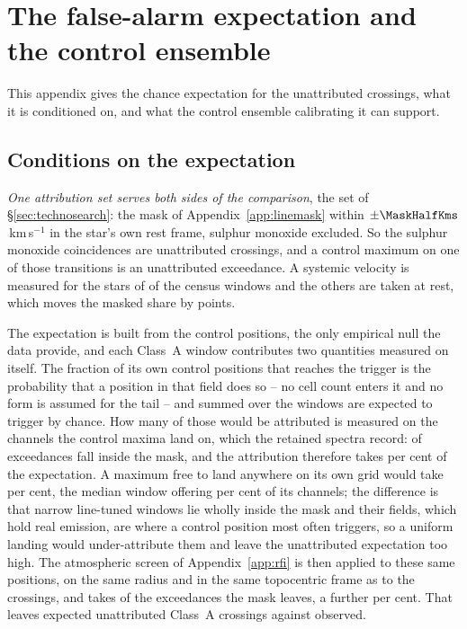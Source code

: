 \section{The false-alarm expectation and the control ensemble}
\label{app:falsealarm}

This appendix gives the chance expectation for the unattributed crossings,
what it is conditioned on, and what the control ensemble calibrating it can
support.

\subsection{Conditions on the expectation}

\emph{One attribution set serves both sides of the comparison}, the set of
\S\ref{sec:technosearch}: the mask of Appendix~\ref{app:linemask} within
$\pm\MaskHalfKms$\,km\,s$^{-1}$ in the star's own rest frame, sulphur monoxide
excluded. So the \MkNSODecide{} sulphur monoxide coincidences are unattributed
crossings, and a control maximum on one of those transitions is an
unattributed exceedance. A systemic velocity is measured for the stars of
\CeNVsys{} of the census windows and the others are taken at rest, which moves
the masked share by \CeVsysSensPct{} points.

The expectation is built from the control positions, the only empirical null
the data provide, and each Class~A window contributes two quantities
measured on itself. The fraction of its own \NCtrl{} control positions that
reaches the trigger is the probability that a position in that field does so
-- no cell count enters it and no form is assumed for the tail -- and
summed over the windows \CeExpTrig{} are expected to trigger by chance. How
many of those would be attributed is measured on the channels the control
maxima land on, which the retained spectra record: \CeNExcAttr{} of
\CeNExc{} exceedances fall inside the mask, and the attribution therefore
takes \CeMaskPct{} per cent of the expectation. A maximum free to land
anywhere on its own grid would take \CeUnifPct{} per cent, the median window
offering \CeMaskPctMed{} per cent of its channels; the difference is that
\CeNFullMask{} narrow line-tuned windows lie wholly inside the mask and
their fields, which hold real emission, are where a control position most
often triggers, so a uniform landing would under-attribute them and leave
the unattributed expectation too high. The atmospheric screen of
Appendix~\ref{app:rfi} is then applied to these same positions, on the same
radius and in the same topocentric frame as to the crossings, and takes
\CeTlCtrlCut{} of the \CeTlCtrlSurv{} exceedances the mask leaves, a further
\CeTlPct{} per cent. That leaves \CeExp{} expected unattributed Class~A
crossings against \CeObs{} observed.


